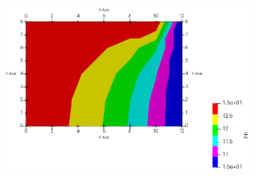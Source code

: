 \documentclass{article} %
\begin{document}
\begin{figure}[H]
\begin{subfigure}[b]{0.49\textwidth}
		\label{}
	\end{subfigure}
	\begin{subfigure}[b]{0.49\textwidth}
		\includegraphics[width=\textwidth]{case3bh}
		
		\label{}
	\end{subfigure}\\
	

\end{figure}
\end{document}
